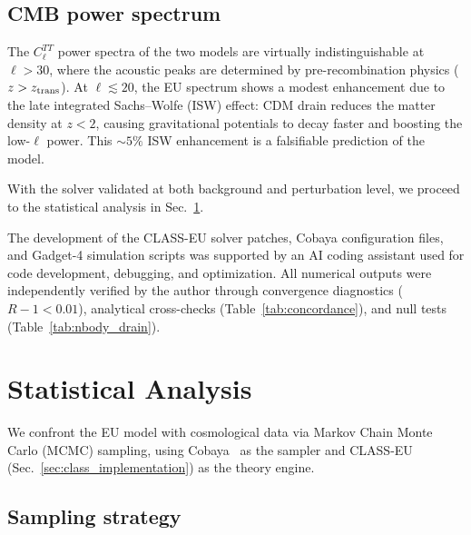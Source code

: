 \documentclass[a4paper,fleqn]{cas-dc}
\newcommand{\ztrans}{z_{\rm trans}}
\begin{document}
\subsection{CMB power spectrum}
\label{sec:cmb_consistency}

The $C_\ell^{TT}$ power spectra of the two models are
virtually indistinguishable at $\ell > 30$, where the acoustic
peaks are determined by pre-recombination physics
($z > \ztrans$). At $\ell \lesssim 20$, the EU spectrum shows
a modest enhancement due to the late integrated Sachs--Wolfe
(ISW) effect: CDM drain reduces the matter density at $z < 2$,
causing gravitational potentials to decay faster and boosting
the low-$\ell$ power. This $\sim 5\%$ ISW enhancement is a
falsifiable prediction of the model.

With the solver validated at both background and perturbation
level, we proceed to the statistical analysis in
Sec.~\ref{sec:mcmc}.

The development of the CLASS-EU solver patches, Cobaya
configuration files, and Gadget-4 simulation scripts was
supported by an AI coding assistant used for code development,
debugging, and optimization. All numerical outputs were
independently verified by the author through convergence
diagnostics ($R-1 < 0.01$), analytical cross-checks
(Table~\ref{tab:concordance}), and null tests
(Table~\ref{tab:nbody_drain}).

\section{Statistical Analysis}
\label{sec:mcmc}

We confront the EU model with cosmological data via Markov
Chain Monte Carlo (MCMC) sampling, using
Cobaya~\cite{torrado2021} as the sampler and CLASS-EU
(Sec.~\ref{sec:class_implementation}) as the theory engine.

\subsection{Sampling strategy}
\label{sec:methodology}
\end{document}
